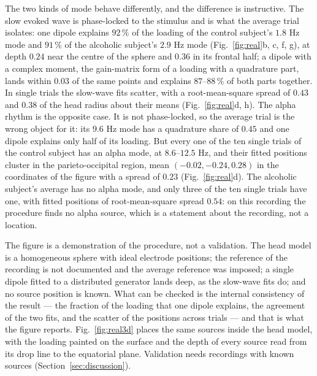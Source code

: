 \documentclass{article}
\begin{document}
The two kinds of mode behave differently, and the difference is instructive. The slow evoked wave is phase-locked to the stimulus and is what the average trial isolates: one dipole explains $92\,\%$ of the loading of the control subject's $1.8$ Hz mode and $91\,\%$ of the alcoholic subject's $2.9$ Hz mode (Fig.~\ref{fig:real}b, c, f, g), at depth $0.24$ near the centre of the sphere and $0.36$ in its frontal half; a dipole with a complex moment, the gain-matrix form of a loading with a quadrature part, lands within $0.03$ of the same points and explains $87$--$88\,\%$ of both parts together. In single trials the slow-wave fits scatter, with a root-mean-square spread of $0.43$ and $0.38$ of the head radius about their means (Fig.~\ref{fig:real}d, h). The alpha rhythm is the opposite case. It is not phase-locked, so the average trial is the wrong object for it: its $9.6$ Hz mode has a quadrature share of $0.45$ and one dipole explains only half of its loading. But every one of the ten single trials of the control subject has an alpha mode, at $8.6$--$12.5$ Hz, and their fitted positions cluster in the parieto-occipital region, mean $(-0.02, -0.24, 0.28)$ in the coordinates of the figure with a spread of $0.23$ (Fig.~\ref{fig:real}d). The alcoholic subject's average has no alpha mode, and only three of the ten single trials have one, with fitted positions of root-mean-square spread $0.54$: on this recording the procedure finds no alpha source, which is a statement about the recording, not a location.

The figure is a demonstration of the procedure, not a validation. The head model is a homogeneous sphere with ideal electrode positions; the reference of the recording is not documented and the average reference was imposed; a single dipole fitted to a distributed generator lands deep, as the slow-wave fits do; and no source position is known. What can be checked is the internal consistency of the result --- the fraction of the loading that one dipole explains, the agreement of the two fits, and the scatter of the positions across trials --- and that is what the figure reports. Fig.~\ref{fig:real3d} places the same sources inside the head model, with the loading painted on the surface and the depth of every source read from its drop line to the equatorial plane. Validation needs recordings with known sources (Section~\ref{sec:discussion}).
\end{document}
